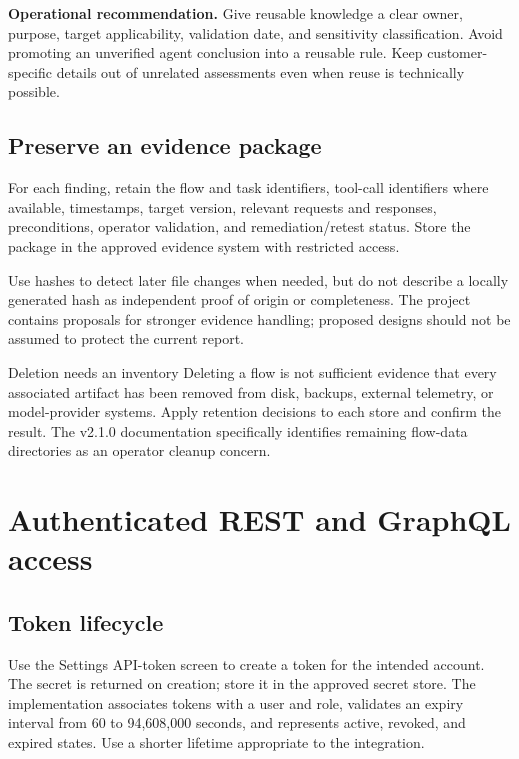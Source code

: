 \documentclass[11pt,letterpaper]{article}
\newcommand{\src}[1]{\cite{#1}}
\begin{document}
\textbf{Operational recommendation.} Give reusable knowledge a clear owner,
purpose, target applicability, validation date, and sensitivity classification.
Avoid promoting an unverified agent conclusion into a reusable rule. Keep
customer-specific details out of unrelated assessments even when reuse is
technically possible.

\subsection{Preserve an evidence package}
For each finding, retain the flow and task identifiers, tool-call identifiers
where available, timestamps, target version, relevant requests and responses,
preconditions, operator validation, and remediation/retest status. Store the
package in the approved evidence system with restricted access.

Use hashes to detect later file changes when needed, but do not describe a
locally generated hash as independent proof of origin or completeness.
The project contains proposals for stronger evidence handling; proposed designs
should not be assumed to protect the current report.

\begin{panel}{Deletion needs an inventory}
Deleting a flow is not sufficient evidence that every associated artifact has
been removed from disk, backups, external telemetry, or model-provider systems.
Apply retention decisions to each store and confirm the result. The v2.1.0
documentation specifically identifies remaining flow-data directories as an
operator cleanup concern. \src{readme}
\end{panel}

\clearpage
\section{Authenticated REST and GraphQL access}
\label{sec:api}
\subsection{Token lifecycle}
Use the Settings API-token screen to create a token for the intended account.
The secret is returned on creation; store it in the approved secret store.
The implementation associates tokens with a user and role, validates an expiry
interval from 60 to 94,608,000 seconds, and represents active, revoked, and
expired states. Use a shorter lifetime appropriate to the integration.
\src{tokens,token-model}
\end{document}
